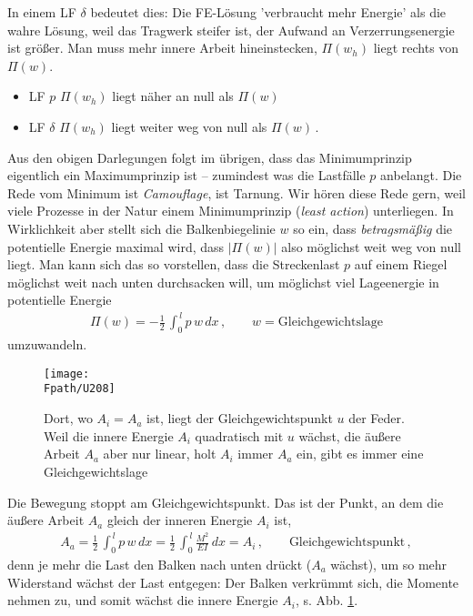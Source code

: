 {{In einem LF $\delta$ bedeutet dies: Die FE-L\"{o}sung 'verbraucht mehr Energie'
als die wahre L\"{o}sung, weil das Tragwerk steifer ist, der Aufwand an Verzerrungsenergie
ist gr\"{o}{\ss}er. Man muss mehr innere Arbeit hineinstecken, $\Pi(w_{h})$ liegt rechts von
$\Pi(w)$.
\begin{itemize}
\item LF $p$ \qquad $\Pi(w_h)$ liegt n\"{a}her an null als $\Pi(w)$
\item LF $\delta $ \qquad $\Pi(w_h)$ liegt weiter weg von null als $\Pi(w)$\,.
\end{itemize}
Aus den obigen Darlegungen folgt im \"{u}brigen, dass das
Minimumprinzip eigentlich ein Maximumprinzip ist -- zumindest was die Lastf\"{a}lle $p$
anbelangt. Die Rede vom Minimum ist {\em Camouflage\/}, ist Tarnung. Wir h\"{o}ren diese
Rede gern, weil viele Prozesse in der Natur einem Minimumprinzip ({\em least action\/})
 unterliegen. In Wirklichkeit aber stellt sich die Balkenbiegelinie
$w$ so ein, dass {\em betragsm\"{a}{\ss}ig\/} die potentielle Energie maximal wird, dass
$|\Pi(w)|$ also m\"{o}glichst weit weg von null liegt. Man kann sich das so vorstellen, dass
die Streckenlast $p$ auf einem Riegel m\"{o}glichst weit nach unten durchsacken will, um
m\"{o}glichst viel Lageenergie in potentielle Energie
\begin{align}
\Pi(w) = - \frac{1}{2}\,\int_0^{\,l} p\,w\,dx\,, \qquad w = \mbox{Gleichgewichtslage}
\end{align}
umzuwandeln.

\begin{figure}[tbp] \centering
\if {} \sidecaption \fi
\centering
\texttt{[image: \\Fpath/U208]}
\caption{Dort, wo $A_i = A_a$ ist, liegt der Gleichgewichtspunkt $u$ der Feder. Weil die
innere Energie $A_i$ quadratisch mit $u$ w\"{a}chst, die \"{a}u{\ss}ere Arbeit $A_a$ aber nur
linear, holt $A_i$ immer $A_a$ ein, gibt es immer eine Gleichgewichtslage}
\label{U208}
\end{figure}%

Die Bewegung stoppt am Gleichgewichtspunkt. Das ist der Punkt, an dem die \"{a}u{\ss}ere Arbeit
$A_a$ gleich der inneren Energie $A_i$ ist,
\begin{align}
A_a = \frac{1}{2}\,\int_0^{\,l} p\,w\,dx = \frac{1}{2}\,\int_0^{\,l} \frac{M^2}{EI}\,dx =
A_i\,,\qquad \mbox{Gleichgewichtspunkt}\,,
\end{align}
denn je mehr die Last den Balken nach unten dr\"{u}ckt ($A_a$ w\"{a}chst), um so mehr Widerstand
w\"{a}chst der Last entgegen: Der Balken verkr\"{u}mmt sich, die Momente nehmen zu, und somit
w\"{a}chst die innere Energie $A_i$, s. Abb. \ref{U208}.

}}
